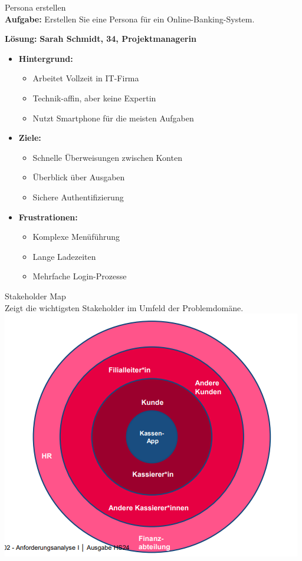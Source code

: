 \begin{example2}{Persona erstellen}\\
\textbf{Aufgabe:} Erstellen Sie eine Persona für ein Online-Banking-System.

\textbf{Lösung:} 
\textbf{Sarah Schmidt, 34, Projektmanagerin}
\begin{itemize}
    \item \textbf{Hintergrund:}
    \begin{itemize}
        \item Arbeitet Vollzeit in IT-Firma
        \item Technik-affin, aber keine Expertin
        \item Nutzt Smartphone für die meisten Aufgaben
    \end{itemize}
    \item \textbf{Ziele:}
    \begin{itemize}
        \item Schnelle Überweisungen zwischen Konten
        \item Überblick über Ausgaben
        \item Sichere Authentifizierung
    \end{itemize}
    \item \textbf{Frustrationen:}
    \begin{itemize}
        \item Komplexe Menüführung
        \item Lange Ladezeiten
        \item Mehrfache Login-Prozesse
    \end{itemize}
\end{itemize}
\end{example2}

\begin{example2}{Stakeholder Map}\\
Zeigt die wichtigsten Stakeholder im Umfeld der Problemdomäne.\\
\includegraphics[width=0.8\linewidth]{images/stakeholdermap.png}
\end{example2}

